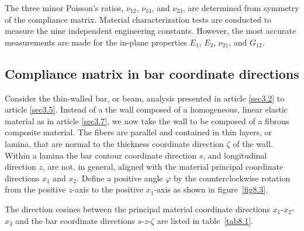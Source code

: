 \documentclass{AeroStructure-ERJohnson}
\begin{document}
\noindent The three minor Poisson's ratios, $\nu_{12}$,
$\nu_{13}$, and $\nu_{23}$, are determined from symmetry of the
compliance matrix. Material characterization tests are conducted
to measure the nine independent engineering constants. However,
the most accurate measurements are made for the in-plane
properties $E_1$, $E_2$, $\nu_{21}$, and $G_{12}$.

\subsection{Compliance matrix in bar coordinate directions}\label{sec8.1.2}

Consider the thin-walled bar, or beam, analysis presented in
article \ref{sec3.2} to article \ref{sec3.5}. Instead of a the
wall composed of a homogeneous, linear elastic material as in
article \ref{sec3.7}, we now take the wall to be composed of a fibrous
composite material. The fibers are parallel and contained in thin
layers, or lamina, that are normal to the thickness coordinate
direction $\zeta$ of the wall. Within a lamina the bar contour
coordinate direction $s$, and longitudinal direction $z$, are not,
in general, aligned with the material principal coordinate
directions $x_1$ and $x_2$. Define a positive angle $\varphi$ by
the counterclockwise rotation from the positive $z$-axis to the
positive $x_1$-axis as shown in figure~\ref{fig8.3}.


\noindent The direction cosines between the principal material coordinate
directions $x_1$-$x_2$-$x_3$ and the bar coordinate directions
$s$-$z$-$\zeta$ are listed in table~\ref{tab8.1}.
\end{document}
